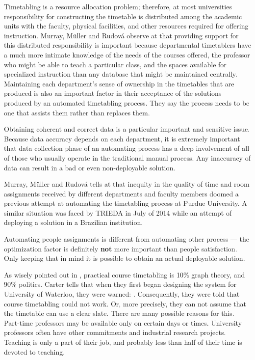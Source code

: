 Timetabling is a resource allocation problem; therefore, at most universities responsibility for constructing the timetable is distributed among the academic units with the faculty, physical facilities, and other resources required for offering instruction. Murray, M\"{u}ller and Rudov\'{a} observe at \cite{Murray2007} that providing support for this distributed responsibility is important because departmental timetablers have a much more intimate knowledge of the needs of the courses offered, the professor who might be able to teach a particular class, and the spaces available for specialized instruction than any database that might be maintained centrally. Maintaining each department's sense of ownership in the timetables that are produced is also an important factor in their acceptance of the solutions produced by an automated timetabling process. They say the process needs to be one that assists them rather than replaces them.

Obtaining coherent and correct data is a particular important and sensitive issue. Because data accuracy depends on each department, it is extremely important that data collection phase of an automating process has a deep involvement of all of those who usually operate in the traditional manual process. Any inaccuracy of data can result in a bad or even non-deployable solution.


Murray, M\"{u}ller and Rudov\'{a} tells at \cite{Murray2007} that inequity in the quality of time and room assignments received by different departments and faculty members doomed a previous attempt at automating the timetabling process at Purdue University. A similar situation was faced by TRIEDA in July of 2014 while an attempt of deploying a solution in a Brazilian institution.

Automating people assignments is different from automating other process --- the optimization factor is definitely \textbf{not} more important than people satisfaction. Only keeping that in mind it is possible to obtain an actual deployable solution.

As wisely pointed out in \cite{Carter2001}, practical course timetabling is 10\% graph theory, and 90\% politics. Carter tells that when they first began designing the system for University of Waterloo, they were warned: . Consequently, they were told that course timetabling could not work. Or, more precisely, they can not assume that the timetable can use a clear slate. There are many possible reasons for this. Part-time professors may be available only on certain days or times. University professors often have other commitments and industrial research projects. Teaching is only a part of their job, and probably less than half of their time is devoted to teaching.

